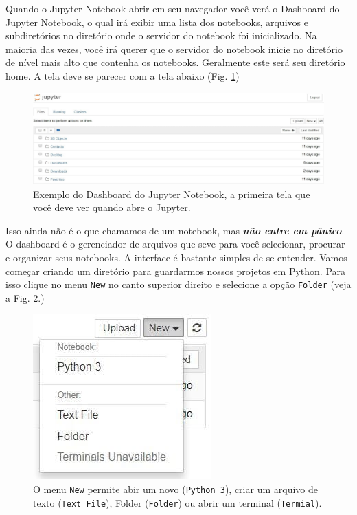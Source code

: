 Quando o Jupyter Notebook abrir em seu navegador você verá o Dashboard do Jupyter Notebook, o qual irá exibir uma lista dos notebooks, arquivos e subdiretórios no diretório onde o servidor do notebook foi inicializado. Na maioria das vezes, você irá querer que o servidor do notebook inicie no diretório de nível mais alto que contenha os notebooks. Geralmente este será seu diretório home. A tela deve se parecer com a tela abaixo (Fig. \ref{fig:JN-Dashboard})
\begin{figure}[h!]
\centering
\includegraphics[scale=0.3]{Images/jupyter-dashboard.jpg}
\caption{Exemplo do Dashboard do Jupyter Notebook, a primeira tela que você deve ver quando abre o Jupyter.}\label{fig:JN-Dashboard}
\end{figure}
Isso ainda não é o que chamamos de um notebook, mas {\it \bf não entre em pânico}. O dashboard é o gerenciador de arquivos que seve para você selecionar, procurar e organizar seus notebooks. A interface é bastante simples de se entender. Vamos começar criando um diretório para guardarmos nossos projetos em Python. Para isso clique no menu {\tt New} no canto superior direito e selecione a opção {\tt Folder} (veja a Fig. \ref{fig:JN-NEW}.)
\begin{figure}[h!]
\centering
\includegraphics[scale=0.4]{Images/new-notebook-menu.jpg}
\caption{O menu {\tt New} permite abir um novo ({\tt Python 3}), criar um arquivo de texto ({\tt Text File}), Folder ({\tt Folder}) ou abrir um terminal ({\tt Termial}).}\label{fig:JN-NEW}
\end{figure}
